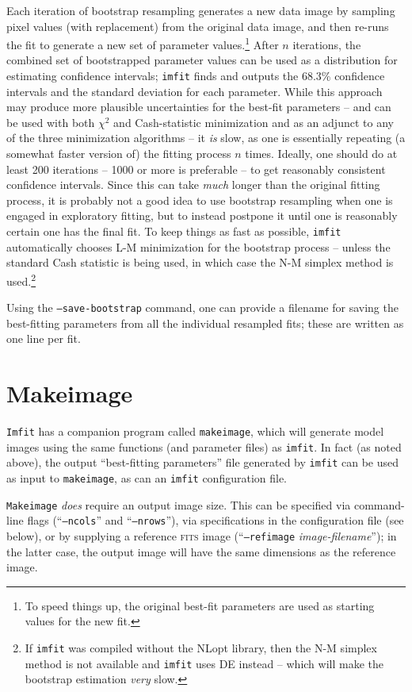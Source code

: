 \documentclass[10pt,a4paper,article]{memoir}
\newcommand{\imfit}{\texttt{imfit}}
\newcommand{\Imfit}{\texttt{Imfit}}
\newcommand{\makeimage}{\texttt{makeimage}}
\newcommand{\Makeimage}{\texttt{Makeimage}}
\newcommand{\chisquare}{\ensuremath{\chi^{2}}}
\begin{document}
Each iteration of bootstrap resampling generates a new data image by
sampling pixel values (with replacement) from the original data image,
and then re-runs the fit to generate a new set of parameter
values.\footnote{To speed things up, the original best-fit parameters
are used as starting values for the new fit.} After $n$ iterations, the
combined set of bootstrapped parameter values can be used as a
distribution for estimating confidence intervals; \imfit{} finds and
outputs the 68.3\% confidence intervals and the standard deviation for
each parameter. While this approach may produce more plausible
uncertainties for the best-fit parameters -- and can be used with both
\chisquare{} and Cash-statistic minimization and as an adjunct to any of
the three minimization algorithms -- it \textit{is} slow, as one is
essentially repeating (a somewhat faster version of) the fitting process
$n$ times. Ideally, one should do at least 200 iterations -- 1000 or
more is preferable -- to get reasonably consistent confidence intervals.
Since this can take \textit{much} longer than the original fitting
process, it is probably not a good idea to use bootstrap resampling when
one is engaged in exploratory fitting, but to instead postpone it until
one is reasonably certain one has the final fit. To keep things as fast
as possible, \imfit{} automatically chooses L-M minimization for the
bootstrap process -- unless the standard Cash statistic is being used, in which
case the N-M simplex method is used.\footnote{If \imfit{} was compiled
without the NLopt library, then the N-M simplex method is not available
and \imfit{} uses DE instead -- which will make the bootstrap estimation
\textit{very} slow.}

Using the \texttt{--save-bootstrap} command, one can provide a filename
for saving the best-fitting parameters from all the individual resampled
fits; these are written as one line per fit.



\chapter{Makeimage}

\Imfit{} has a companion program called \makeimage, which will generate model
images using the same functions (and parameter files) as \imfit. In fact (as
noted above), the output ``best-fitting parameters'' file generated by \imfit{}
can be used as input to \makeimage, as can an \imfit{} configuration file.

\Makeimage{} \textit{does} require an output image size.  This can be specified
via command-line flags (``\texttt{--ncols}'' and ``\texttt{--nrows}''), via
specifications in the configuration file (see below), or by supplying a
reference \textsc{fits} image (``\texttt{--refimage} \textit{image-filename}''); in the
latter case, the output image will have the same dimensions as the reference
image.
\end{document}
